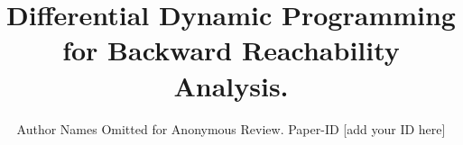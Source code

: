 \documentclass[conference]{IEEEtran}
\begin{document}
\title{Differential Dynamic Programming for Backward Reachability  Analysis.}

\author{Author Names Omitted for Anonymous Review. Paper-ID [add your ID here]}





% 


\maketitle


%
%








\IEEEpeerreviewmaketitle




	 
\end{document}
